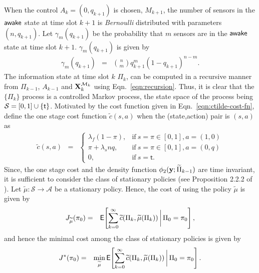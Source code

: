 \documentclass[journal]{IEEEtran}
\newcommand{\wake}{{${\sf awake }$}}
\newcommand{\EXP}[1]{\mathsf{E}\!\left[#1\right]}
\begin{document}
When the control $A_k = (0,q_{k+1})$ is chosen, $M_{k+1}$, the number of sensors in the 
{\wake} state at time slot $k+1$ is {\em Bernoulli} distributed with parameters 
$(n,q_{k+1})$. Let $\gamma_m(q_{k+1})$ be the probability that $m$ sensors are in the 
{\wake} state at time slot $k+1$. $\gamma_m(q_{k+1})$ is given by 
\begin{eqnarray}
\gamma_m(q_{k+1}) & = & \binom{n}{m}q_{k+1}^m (1-q_{k+1})^{n-m}.
\end{eqnarray}
The information state at time slot $k$ $\Pi_k$, can be computed in a recursive
manner from $\Pi_{k-1}$, $A_{k-1}$ and ${\bf X}_k^{{\cal M}_k}$ 
using Eqn.~\ref{eqn:recursion}. Thus, it is clear that 
the $\{\Pi_k\}$ process is a controlled Markov process, the 
state space of the process being $\mathcal{S} = [0,1] \cup \{{\sf t}\}$.  
Motivated by the cost function given in 
Eqn.~\ref{eqn:ctilde-cost-fn}, define the one stage cost 
function $\widetilde c\left(s,a\right)$ 
when the (state,action) pair is $(s,a)$ as
\begin{eqnarray*}
\widetilde c\left(s,a\right)
& = &  \left\{
                           \begin{array}{ll}  
                           \lambda_f (1 - \pi), & \text{if} \ s=\pi \in [0,1], a =
						   (1,0)\\
                           \pi + \lambda_s nq,  & \text{if} \ s=\pi \in [0,1], a = (0,q)\\
                           0,                   & \text{if} \ s = \mathsf{t}.
                           \end{array} 
                           \right.    
\end{eqnarray*}
Since, the one stage cost and the density function 
$\phi_2({\bf y};\widetilde{\Pi}_{k-1})$ are time invariant, it is sufficient to consider the
class of stationary policies
(see Proposition 2.2.2 of \cite{books.bertsekas07b}). Let $\widetilde\mu:\mathcal{S}\to\mathcal{A}$ be a 
stationary policy. Hence, the cost of using the policy $\widetilde\mu$ is given by 
\begin{eqnarray*}
J_{\widetilde\mu}(\pi_0) & = &  \EXP{\sum_{k=0}^\infty \widetilde c(\Pi_k,\widetilde\mu(\Pi_k)) \bigg\arrowvert \Pi_0 = \pi_0},
\end{eqnarray*}
and hence the minimal cost among the class of stationary policies is
given by
\begin{eqnarray*}
J^*(\pi_0) & = & \min_{\widetilde\mu} \EXP{\sum_{k=0}^\infty \widetilde c(\Pi_k,\widetilde\mu(\Pi_k))
\bigg\arrowvert \Pi_0 = \pi_0}. 
\end{eqnarray*}
\end{document}
